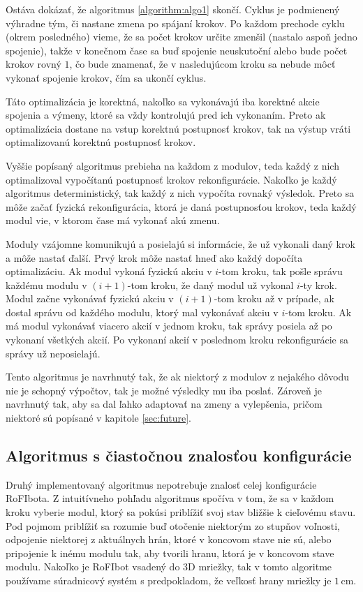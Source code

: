 \documentclass[
  printed, %
  oneside, %
  notable,   %
  nolof,     %
  nolot,     %
]{fithesis3}
\begin{document}
Ostáva dokázať, že algoritmus \ref{algorithm:algo1} skončí. Cyklus je podmienený výhradne tým, či nastane zmena po spájaní krokov. Po každom prechode cyklu (okrem posledného) vieme, že sa počet krokov určite zmenšil (nastalo aspoň jedno spojenie), takže v konečnom čase sa buď spojenie neuskutoční alebo bude počet krokov rovný $1$, čo bude znamenať, že v nasledujúcom kroku sa nebude môcť vykonať spojenie krokov, čím sa ukončí cyklus. 

Táto optimalizácia je korektná, nakoľko sa vykonávajú iba korektné akcie spojenia a výmeny, ktoré sa vždy kontrolujú pred ich vykonaním. Preto ak optimalizácia dostane na vstup korektnú postupnosť krokov, tak na výstup vráti optimalizovanú korektnú postupnosť krokov. 

Vyššie popísaný algoritmus prebieha na každom z modulov, teda každý z nich optimalizoval vypočítanú postupnosť krokov rekonfigurácie. Nakoľko je každý algoritmus deterministický, tak každý z nich vypočíta rovnaký výsledok. Preto sa môže začať fyzická rekonfigurácia, ktorá je daná postupnosťou krokov, teda každý modul vie, v ktorom čase má vykonať akú zmenu. 

Moduly vzájomne komunikujú a posielajú si informácie, že už vykonali daný krok a môže nastať ďalší. Prvý krok môže nastať hneď ako každý dopočíta optimalizáciu. Ak modul vykoná fyzickú akciu v $i$-tom kroku, tak pošle správu každému modulu v $(i + 1)$-tom kroku, že daný modul už vykonal $i$-ty krok. Modul začne vykonávať fyzickú akciu v $(i + 1)$-tom kroku až v prípade, ak dostal správu od každého modulu, ktorý mal vykonávať akciu v $i$-tom kroku. Ak má modul vykonávať viacero akcií v jednom kroku, tak správy posiela až po vykonaní všetkých akcií. Po vykonaní akcií v poslednom kroku rekonfigurácie sa správy už neposielajú. 

Tento algoritmus je navrhnutý tak, že ak niektorý z modulov z nejakého dôvodu nie je schopný výpočtov, tak je možné výsledky mu iba poslať. Zároveň je navrhnutý tak, aby sa dal ľahko adaptovať na zmeny a vylepšenia, pričom niektoré sú popísané v kapitole \ref{sec:future}.  

\subsection{Algoritmus s čiastočnou znalosťou konfigurácie}
\label{sec:distributedAlgo}
Druhý implementovaný algoritmus nepotrebuje znalosť celej konfigurácie RoFIbota. Z intuitívneho pohľadu algoritmus spočíva v tom, že sa v každom kroku vyberie modul, ktorý sa pokúsi priblížiť svoj stav bližšie k cieľovému stavu. Pod pojmom priblížiť sa rozumie buď otočenie niektorým zo stupňov voľnosti, odpojenie niektorej z aktuálnych hrán, ktoré v koncovom stave nie sú, alebo pripojenie k inému modulu tak, aby tvorili hranu, ktorá je v koncovom stave modulu. Nakoľko je RoFIbot vsadený do 3D mriežky, tak v tomto algoritme používame súradnicový systém s predpokladom, že veľkosť hrany mriežky je $1$\,cm. 
\end{document}
